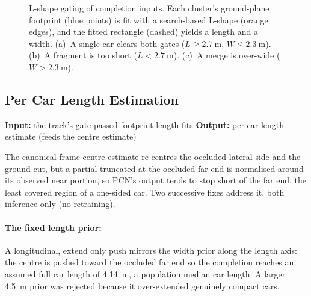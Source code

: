 \documentclass[a4paper,12pt]{report}
\begin{document}
\begin{figure}[H]
  \caption[L-shape gating of completion inputs]{L-shape gating of completion inputs. Each
    cluster's ground-plane footprint (blue points) is fit with a search-based L-shape (orange
    edges), and the fitted rectangle (dashed) yields a length and a width. (a)~A single car
    clears both gates ($L\ge\SI{2.7}{\meter}$, $W\le\SI{2.3}{\meter}$). (b)~A fragment is too
    short ($L<\SI{2.7}{\meter}$). (c)~A merge is over-wide ($W>\SI{2.3}{\meter}$).}
  \label{fig:lshape-gate}
\end{figure}

\subsection{Per Car Length Estimation}
\label{sec:completion-length}

\noindent \textbf{Input:} the track's gate-passed footprint length fits \quad \textbar \quad \textbf{Output:} per-car length estimate (feeds the centre estimate) \vspace{0.5em}

The canonical frame centre estimate re-centres the occluded lateral side and the
ground cut, but a partial truncated at the occluded far end is normalised
around its observed near portion, so PCN's output tends to stop short of the far end,
the least covered region of a one-sided car. Two successive fixes address it, both
inference only (no retraining).

\paragraph{The fixed length prior:} A longitudinal, extend only
push mirrors the width prior along the length axis: the centre is pushed toward
the occluded far end so the completion reaches an assumed full car length of
\SI{4.14}{\meter}, a population median car length. A larger \SI{4.5}{\meter} prior
was rejected because it over-extended genuinely compact cars.
\end{document}
